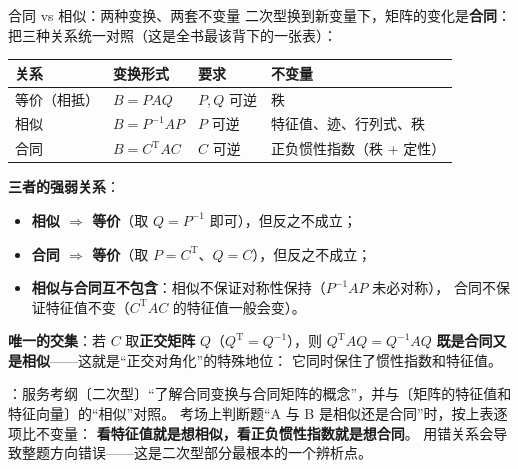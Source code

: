\begin{fdeep}{合同 vs 相似：两种变换、两套不变量}
二次型换到新变量下，矩阵的变化是\textbf{合同}：
把三种关系统一对照（这是全书最该背下的一张表）：

\begin{center}
\begin{tabular}{@{}llll@{}}
\toprule
关系 & 变换形式 & 要求 & 不变量 \\
\midrule
等价（相抵） & $B=PAQ$ & $P,Q$ 可逆 & 秩 \\
相似 & $B=P^{-1}AP$ & $P$ 可逆 & 特征值、迹、行列式、秩 \\
合同 & $B=C^{\mathrm T}AC$ & $C$ 可逆 & 正负惯性指数（秩 + 定性） \\
\bottomrule
\end{tabular}
\end{center}

\textbf{三者的强弱关系}：
\begin{itemize}[leftmargin=2.2em,itemsep=0.22em]
\item \textbf{相似 $\Rightarrow$ 等价}（取 $Q=P^{-1}$ 即可），但反之不成立；
\item \textbf{合同 $\Rightarrow$ 等价}（取 $P=C^{\mathrm T}$、$Q=C$），但反之不成立；
\item \textbf{相似与合同互不包含}：相似不保证对称性保持（$P^{-1}AP$ 未必对称），
      合同不保证特征值不变（$C^{\mathrm T}AC$ 的特征值一般会变）。
\end{itemize}
\textbf{唯一的交集}：若 $C$ 取\textbf{正交矩阵} $Q$（$Q^{\mathrm T}=Q^{-1}$），则
$Q^{\mathrm T}AQ=Q^{-1}AQ$ \textbf{既是合同又是相似}——这就是“正交对角化”的特殊地位：
它同时保住了惯性指数和特征值。

\fbref{}：服务考纲〔二次型〕“了解合同变换与合同矩阵的概念”，并与〔矩阵的特征值和特征向量〕的“相似”对照。
考场上判断题“A 与 B 是相似还是合同”时，按上表逐项比不变量：
\textbf{看特征值就是想相似，看正负惯性指数就是想合同}。
用错关系会导致整题方向错误——这是二次型部分最根本的一个辨析点。
\end{fdeep}


